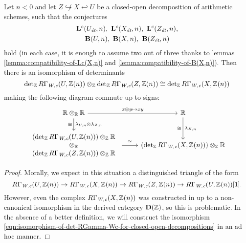 \documentclass{article}
\numberwithin{equation}{section}
\begin{document}
\begin{lemma}
  \label{lemma:lambda-and-closed-open-decompositions}
  Let $n < 0$ and let $Z \not\hookrightarrow X \hookleftarrow U$ be a
  closed-open decomposition of arithmetic schemes, such that the conjectures
  \begin{gather*}
    \mathbf{L}^c (U_\et,n), ~ \mathbf{L}^c (X_\et,n), ~ \mathbf{L}^c (Z_\et,n),\\
    \mathbf{B} (U,n), ~ \mathbf{B} (X,n), ~ \mathbf{B} (Z_\et,n)
  \end{gather*}
  hold (in each case, it is enough to assume two out of three thanks to lemmas
  \ref{lemma:compatibility-of-Lc(X,n)} and \ref{lemma:compatibility-of-B(X,n)}).
  Then there is an isomorphism of determinants
  \begin{equation}
    \label{eqn:isomorphism-of-det-RGamma-Wc-for-closed-open-decompositions}
    \det_\ZZ R\Gamma_\Wc (U, \ZZ(n)) \otimes_\ZZ
    \det_\ZZ R\Gamma_\Wc (Z, \ZZ(n)) \cong
    \det_\ZZ R\Gamma_\Wc (X, \ZZ(n))
  \end{equation}
  making the following diagram commute up to signs:
  \begin{equation}
    \label{eqn:lambda-and-closed-open-decompositions}
    \begin{tikzcd}
      \RR \otimes_\RR \RR \ar{r}{x\otimes y \mapsto xy}\ar{d}{\lambda_{U,n} \otimes \lambda_{Z,n}}[swap]{\cong} & \RR\ar{d}{\lambda_{X,n}}[swap]{\cong} \\
      \begin{array}{c} (\det_\ZZ R\Gamma_\Wc (U, \ZZ(n)))\otimes_\ZZ \RR \\ \otimes_\RR \\ (\det_\ZZ R\Gamma_\Wc (Z, \ZZ(n)))\otimes_\ZZ \RR \end{array} \ar{r}{\cong} & (\det_\ZZ R\Gamma_\Wc (X, \ZZ(n))) \otimes_\ZZ \RR
    \end{tikzcd}
  \end{equation}

  \begin{proof}
    Morally, we expect in this situation a distinguished triangle of the form
    \begin{equation}
      \label{eqn:U-X-Z-triangle-for-RGamma-Wc}
      R\Gamma_\Wc (U, \ZZ(n)) \to
      R\Gamma_\Wc (X, \ZZ(n)) \to
      R\Gamma_\Wc (Z, \ZZ(n)) \to
      R\Gamma_\Wc (U, \ZZ(n)) [1].
    \end{equation}
    However, even the complex $R\Gamma_\Wc (X, \ZZ(n))$ was constructed in
    \cite{Beshenov-Weil-etale-1} up to a non-canonical isomorphism in
    the derived category $\mathbf{D} (\ZZ)$, so this is problematic. In the
    absence of a better definition, we will construct the isomorphism
    \eqref{eqn:isomorphism-of-det-RGamma-Wc-for-closed-open-decompositions} in
    an ad hoc manner.


\end{proof}
\end{lemma}
\end{document}
